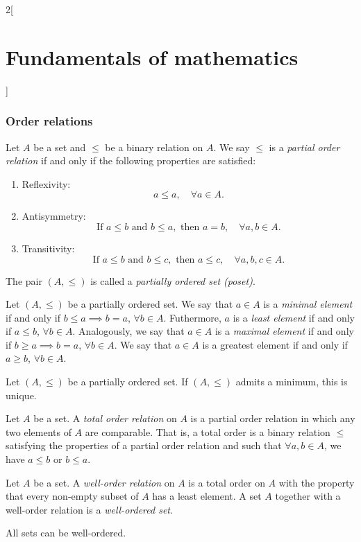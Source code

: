 \documentclass[../../../main.tex]{subfiles}
\begin{document}
\begin{multicols}{2}[\section{Fundamentals of mathematics}]
  \subsubsection{Order relations}
  \begin{definition}\label{FM-order_relations}
    Let $A$ be a set and $\leq$ be a binary relation on $A$. We say $\leq$ is a \textit{partial order relation} if and only if the following properties are satisfied:
    \begin{enumerate}
      \item Reflexivity:
            $$a\leq a,\quad\forall a\in A.$$
      \item Antisymmetry:
            $$\text{If }a\leq b\text{ and }b\leq a,\text{ then }a=b,\quad\forall a,b\in A.$$
      \item Transitivity:
            $$\text{If }a\leq b\text{ and }b\leq c,\text{ then }a\leq c,\quad\forall a,b,c\in A.$$
    \end{enumerate}
    The pair $(A,\leq)$ is called a \textit{partially ordered set (poset)}.
  \end{definition}
  \begin{definition}
    Let $(A,\leq)$ be a partially ordered set. We say that $a\in A$ is a \textit{minimal element} if and only if $b\leq a\implies b=a$, $\forall b\in A$. Futhermore, $a$ is a \textit{least element} if and only if $a\leq b$, $\forall b\in A$. Analogously, we say that $a\in A$ is a \textit{maximal element} if and only if $b\geq a\implies b=a$, $\forall b\in A$. We say that $a\in A$ is a greatest element if and only if $a\geq b$, $\forall b\in A$.
  \end{definition}
  \begin{lemma}
    Let $(A,\leq)$ be a partially ordered set. If $(A,\leq)$ admits a minimum, this is unique.
  \end{lemma}
  \begin{definition}
    Let $A$ be a set. A \textit{total order relation} on $A$ is a partial order relation in which any two elements of $A$ are comparable. That is, a total order is a binary relation $\leq$ satisfying the properties of a partial order relation and such that $\forall a,b\in A$, we have $a\leq b$ or $b\leq a$.
  \end{definition}
  \begin{definition}
    Let $A$ be a set. A \textit{well-order relation} on $A$ is a total order on $A$ with the property that every non-empty subset of $A$ has a least element. A set $A$ together with a well-order relation is a \textit{well-ordered set}.
  \end{definition}
  \begin{theorem}
    All sets can be well-ordered.
  \end{theorem}

\end{multicols}
\end{document}
